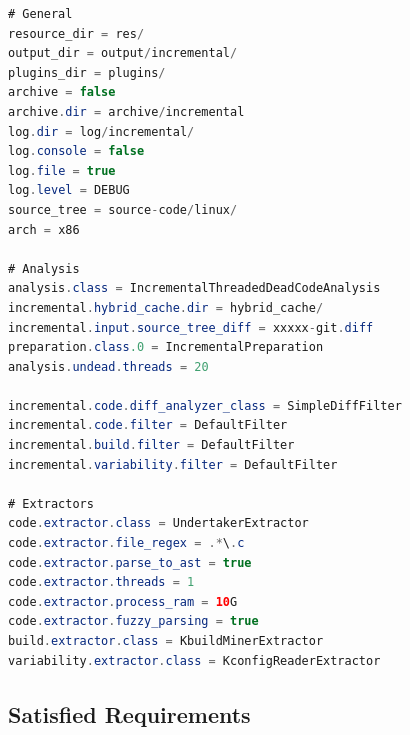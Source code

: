 \documentclass[a4paper]{article}
\begin{document}
\begin{lstlisting}[language=java]
# General
resource_dir = res/
output_dir = output/incremental/
plugins_dir = plugins/
archive = false
archive.dir = archive/incremental
log.dir = log/incremental/
log.console = false
log.file = true
log.level = DEBUG
source_tree = source-code/linux/
arch = x86

# Analysis  
analysis.class = IncrementalThreadedDeadCodeAnalysis
incremental.hybrid_cache.dir = hybrid_cache/
incremental.input.source_tree_diff = xxxxx-git.diff
preparation.class.0 = IncrementalPreparation
analysis.undead.threads = 20

incremental.code.diff_analyzer_class = SimpleDiffFilter
incremental.code.filter = DefaultFilter
incremental.build.filter = DefaultFilter
incremental.variability.filter = DefaultFilter

# Extractors  
code.extractor.class = UndertakerExtractor
code.extractor.file_regex = .*\.c
code.extractor.parse_to_ast = true
code.extractor.threads = 1
code.extractor.process_ram = 10G
code.extractor.fuzzy_parsing = true
build.extractor.class = KbuildMinerExtractor
variability.extractor.class = KconfigReaderExtractor
\end{lstlisting}

\clearpage

\subsection{Satisfied Requirements}
\end{document}
